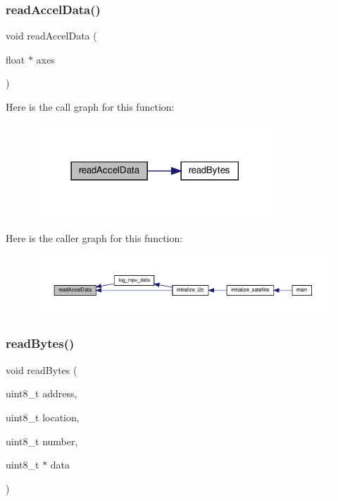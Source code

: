 \subsubsection{\texorpdfstring{read\+Accel\+Data()}{readAccelData()}}
{\footnotesize\ttfamily void read\+Accel\+Data (\begin{DoxyParamCaption}\item[{float $\ast$}]{axes }\end{DoxyParamCaption})}

Here is the call graph for this function\+:\nopagebreak
\begin{figure}[H]
\begin{center}
\leavevmode
\includegraphics[width=258pt]{i2c-interface_8c_a10fba4cab7c9dfec51afa190dba4c1e9_cgraph}
\end{center}
\end{figure}
Here is the caller graph for this function\+:\nopagebreak
\begin{figure}[H]
\begin{center}
\leavevmode
\includegraphics[width=350pt]{i2c-interface_8c_a10fba4cab7c9dfec51afa190dba4c1e9_icgraph}
\end{center}
\end{figure}
\mbox{\label{i2c-interface_8c_acc553fa90ebff27c5f1d36e44160c181}} 
\subsubsection{\texorpdfstring{read\+Bytes()}{readBytes()}}
{\footnotesize\ttfamily void read\+Bytes (\begin{DoxyParamCaption}\item[{uint8\+\_\+t}]{address,  }\item[{uint8\+\_\+t}]{location,  }\item[{uint8\+\_\+t}]{number,  }\item[{uint8\+\_\+t $\ast$}]{data }\end{DoxyParamCaption})}

